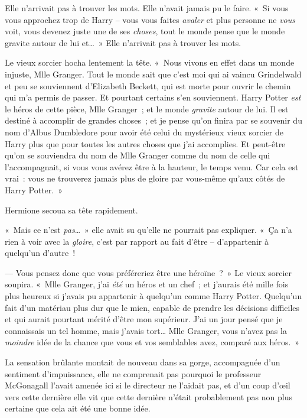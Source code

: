 Elle n'arrivait pas à trouver les mots. Elle n'avait jamais pu le faire. «~Si vous vous approchez trop de Harry -- vous vous faites \emph{avaler} et plus personne ne \emph{vous} voit, vous devenez juste une de ses \emph{choses}, tout le monde pense que le monde gravite autour de lui et…~» Elle n'arrivait pas à trouver les mots.

Le vieux sorcier hocha lentement la tête. «~Nous vivons en effet dans un monde injuste, Mlle Granger. Tout le monde sait que c'est moi qui ai vaincu Grindelwald et peu se souviennent d'Elizabeth Beckett, qui est morte pour ouvrir le chemin qui m'a permis de passer. Et pourtant certains s'en souviennent. Harry Potter \emph{est} le héros de cette pièce, Mlle Granger~; et le monde \emph{gravite} autour de lui. Il est destiné à accomplir de grandes choses~; et je pense qu'on finira par se souvenir du nom d'Albus Dumbledore pour avoir été celui du mystérieux vieux sorcier de Harry plus que pour toutes les autres choses que j'ai accomplies. Et peut-être qu'on se souviendra du nom de Mlle Granger comme du nom de celle qui l'accompagnait, si vous vous avérez être à la hauteur, le temps venu. Car cela est vrai~: vous ne trouverez jamais plus de gloire par vous-même qu'aux côtés de Harry Potter.~»

Hermione secoua sa tête rapidement.

«~Mais ce n'est \emph{pas}…~» elle avait su qu'elle ne pourrait pas expliquer. «~Ça n'a rien à voir avec la \emph{gloire}, c'est par rapport au fait d'être -- d'appartenir à quelqu'un d'autre~!

--- Vous pensez donc que vous préféreriez être une héroïne~?~» Le vieux sorcier soupira. «~Mlle Granger, j'ai \emph{été} un héros et un chef~; et j'aurais été mille fois plus heureux si j'avais pu appartenir à quelqu'un comme Harry Potter. Quelqu'un fait d'un matériau plus dur que le mien, capable de prendre les décisions difficiles et qui aurait pourtant mérité d'être mon supérieur. J'ai un jour pensé que je connaissais un tel homme, mais j'avais tort… Mlle Granger, vous n'avez pas la \emph{moindre} idée de la chance que vous et vos semblables avez, comparé aux héros.~»

La sensation brûlante montait de nouveau dans sa gorge, accompagnée d'un sentiment d'impuissance, elle ne comprenait pas pourquoi le professeur McGonagall l'avait amenée ici si le directeur ne l'aidait pas, et d'un coup d'œil vers cette dernière elle vit que cette dernière n'était probablement pas non plus certaine que cela ait été une bonne idée.

